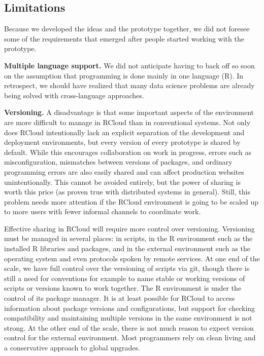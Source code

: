 \subsection{Limitations}

Because we developed the ideas and the prototype together,
we did not foresee some of the requirements that emerged
after people started working with the prototype.

{\bf Multiple language support.}
We did not anticipate having to back off so soon on the
assumption that programming is done mainly in one language (R).
In retrospect, we should have realized that many data science problems
are already being solved with cross-language approaches.

{\bf Versioning.}
A disadvantage is that some important aspects of the environment
are more difficult to manage in RCloud than in conventional systems.
Not only does RCloud intentionally lack an explicit separation of the
development and deployment environments, but every version of every
prototype is shared by default. While this encourages collaboration on
work in progress, errors such as misconfiguration, mismatches between
versions of packages, and ordinary programming errors are also
easily shared and can affect production websites unintentionally.
This cannot be avoided entirely, but the power of sharing is worth
this price (as proven true with distributed systems in general).
Still, this problem needs more attention if the RCloud environment is
going to be scaled up to more users with fewer informal channels to
coordinate work.

Effective sharing in RCloud will require more control over versioning.
Versioning must be managed in several places: in scripts, in the R environment
such as the installed R libraries and packages, and in the external
environment such as the operating system and even protocols spoken by
remote services. At one end of the scale, we have full control over the
versioning of scripts via git, though there is still a need for conventions
for example to name stable or working versions of scripts or versions known
to work together. The R environment is under the control of its package
manager. It is at least possible for RCloud to access information about
package versions and configurations, but support for checking compatibility
and maintaining multiple versions in the same environment is not strong.
At the other end of the scale, there is not much reason to expect version
control for the external environment. Most programmers rely on clean living
and a conservative approach to global upgrades.

